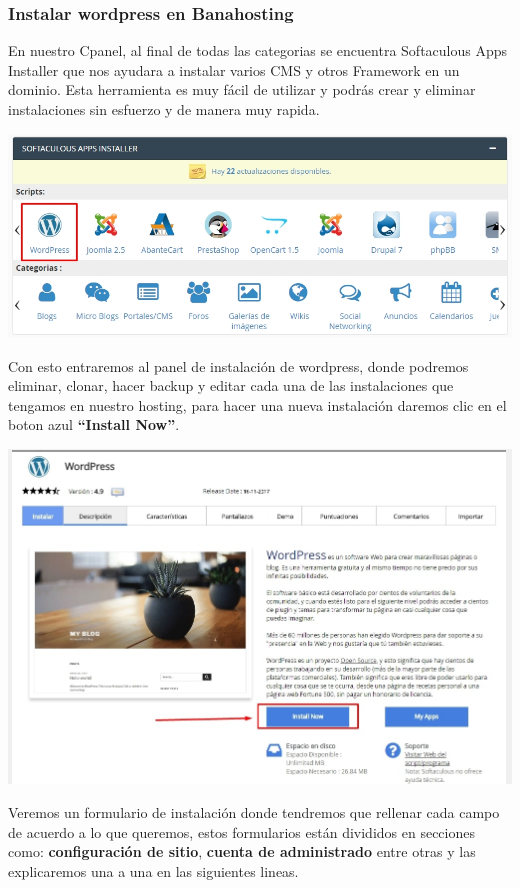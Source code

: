 	\newpage
		
		\subsubsection{Instalar wordpress en Banahosting}
		
		En nuestro Cpanel, al final de todas las categorias se encuentra Softaculous Apps Installer que nos ayudara a instalar varios CMS y otros Framework en un dominio. Esta herramienta es muy fácil de utilizar y podrás crear  y eliminar instalaciones sin esfuerzo y de manera muy rapida.\\
		
		\begin{center}
			\includegraphics[scale=0.5]{image/image1.jpg}
		\end{center}
	
		Con esto entraremos al panel de instalación de wordpress, donde podremos eliminar, clonar, hacer backup y editar cada una de las instalaciones que tengamos en nuestro hosting, para hacer una nueva instalación daremos clic en el boton azul {\color{blue}\textbf{“Install Now”}}.\\
		
		\begin{center}
			\includegraphics[scale=0.32]{image/image2.jpg}
		\end{center}
		\newpage
		Veremos un formulario de instalación donde tendremos que rellenar cada campo de acuerdo a lo que queremos, estos formularios están divididos en secciones como: \textbf{configuración de sitio}, \textbf{cuenta de administrado} entre otras y las explicaremos una a una en las siguientes lineas.\\
		
